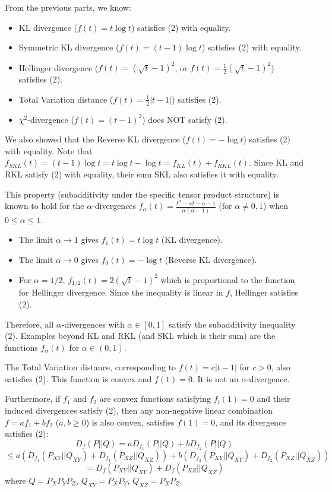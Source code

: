 \documentclass{article}
\begin{document}
From the previous parts, we know:
\begin{itemize}
    \item KL divergence ($f(t) = t \log t$) satisfies (2) with equality.
    \item Symmetric KL divergence ($f(t) = (t-1) \log t$) satisfies (2) with equality.
    \item Hellinger divergence ($f(t) = (\sqrt{t}-1)^2$, or $f(t) = \frac{1}{2}(\sqrt{t}-1)^2$) satisfies (2).
    \item Total Variation distance ($f(t) = \frac{1}{2}|t-1|$) satisfies (2).
    \item $\chi^2$-divergence ($f(t) = (t-1)^2$) does NOT satisfy (2).
\end{itemize}
We also showed that the Reverse KL divergence ($f(t) = -\log t$) satisfies (2) with equality.
Note that $f_{SKL}(t) = (t-1)\log t = t \log t - \log t = f_{KL}(t) + f_{RKL}(t)$. Since KL and RKL satisfy (2) with equality, their sum SKL also satisfies it with equality.

This property (subadditivity under the specific tensor product structure) is known to hold for the $\alpha$-divergences $f_\alpha(t) = \frac{t^\alpha - \alpha t + \alpha - 1}{\alpha(\alpha-1)}$ (for $\alpha \ne 0, 1$) when $0 \le \alpha \le 1$.
\begin{itemize}
    \item The limit $\alpha \to 1$ gives $f_1(t) = t \log t$ (KL divergence).
    \item The limit $\alpha \to 0$ gives $f_0(t) = -\log t$ (Reverse KL divergence).
    \item For $\alpha = 1/2$, $f_{1/2}(t) = 2(\sqrt{t}-1)^2$ which is proportional to the function for Hellinger divergence. Since the inequality is linear in $f$, Hellinger satisfies (2).
\end{itemize}
Therefore, all $\alpha$-divergences with $\alpha \in [0, 1]$ satisfy the subadditivity inequality (2). Examples beyond KL and RKL (and SKL which is their sum) are the functions $f_\alpha(t)$ for $\alpha \in (0, 1)$.

The Total Variation distance, corresponding to $f(t) = c|t-1|$ for $c>0$, also satisfies (2). This function is convex and $f(1)=0$. It is not an $\alpha$-divergence.

Furthermore, if $f_1$ and $f_2$ are convex functions satisfying $f_i(1)=0$ and their induced divergences satisfy (2), then any non-negative linear combination $f = a f_1 + b f_2$ ($a, b \ge 0$) is also convex, satisfies $f(1)=0$, and its divergence satisfies (2):
\[ D_f(P || Q) = a D_{f_1}(P || Q) + b D_{f_2}(P || Q) \]
\[ \le a (D_{f_1}(P_{XY} || Q_{XY}) + D_{f_1}(P_{XZ} || Q_{XZ})) + b (D_{f_2}(P_{XY} || Q_{XY}) + D_{f_2}(P_{XZ} || Q_{XZ})) \]
\[ = D_f(P_{XY} || Q_{XY}) + D_f(P_{XZ} || Q_{XZ}) \]
where $Q=P_X P_Y P_Z$, $Q_{XY}=P_X P_Y$, $Q_{XZ}=P_X P_Z$.
\end{document}
